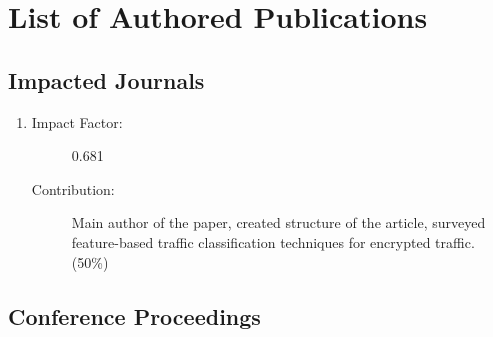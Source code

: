 \chapter{List of Authored Publications}


\section{Impacted Journals}

\begin{enumerate}
	\item {}
	\begin{description}
      \item[Impact Factor:] 0.681
      \item[Contribution:] Main author of the paper, created structure of the article, surveyed feature-based traffic classification techniques for encrypted traffic. (50\%)
    \end{description}

\end{enumerate}

\section{Conference Proceedings}

